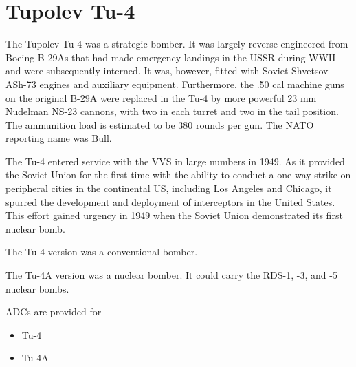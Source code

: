 \section*{Tupolev Tu-4}

The Tupolev Tu-4 was a strategic bomber. It was largely reverse-engineered from Boeing B-29As that had made emergency landings in the USSR during WWII and were subsequently interned. It was, however, fitted with Soviet Shvetsov ASh-73 engines and auxiliary equipment. Furthermore, the .50 cal machine guns on the original B-29A were replaced in the Tu-4 by more powerful 23 mm Nudelman NS-23 cannons, with two in each turret and two in the tail position. The ammunition load is estimated to be 380 rounds per gun. The NATO reporting name was Bull.

The Tu-4 entered service with the VVS in large numbers in 1949. As it provided the Soviet Union for the first time with the ability to conduct a one-way strike on peripheral cities in the continental US, including Los Angeles and Chicago, it spurred the development and deployment of interceptors in the United States. This effort gained urgency in 1949 when the Soviet Union demonstrated its first nuclear bomb.

The Tu-4 version was a conventional bomber.

The Tu-4A version was a nuclear bomber. It could carry the RDS-1, -3, and -5 nuclear bombs.

ADCs are provided for
\begin{itemize}
    \item Tu-4
    \item Tu-4A
\end{itemize}
